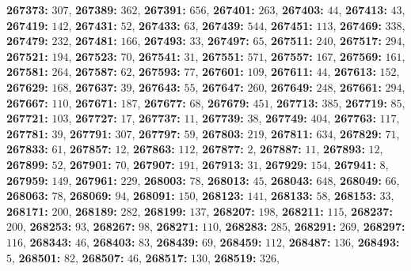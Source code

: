 \textsf{\bfseries 267373:} $307$, \textsf{\bfseries 267389:} $362$, \textsf{\bfseries 267391:} $656$, \textsf{\bfseries 267401:} $263$, \textsf{\bfseries 267403:} $44$, \textsf{\bfseries 267413:} $43$, \textsf{\bfseries 267419:} $142$, \textsf{\bfseries 267431:} $52$, \textsf{\bfseries 267433:} $63$, \textsf{\bfseries 267439:} $544$, \textsf{\bfseries 267451:} $113$, \textsf{\bfseries 267469:} $338$, \textsf{\bfseries 267479:} $232$, \textsf{\bfseries 267481:} $166$, \textsf{\bfseries 267493:} $33$, \textsf{\bfseries 267497:} $65$, \textsf{\bfseries 267511:} $240$, \textsf{\bfseries 267517:} $294$, \textsf{\bfseries 267521:} $194$, \textsf{\bfseries 267523:} $70$, \textsf{\bfseries 267541:} $31$, \textsf{\bfseries 267551:} $571$, \textsf{\bfseries 267557:} $167$, \textsf{\bfseries 267569:} $161$, \textsf{\bfseries 267581:} $264$, \textsf{\bfseries 267587:} $62$, \textsf{\bfseries 267593:} $77$, \textsf{\bfseries 267601:} $109$, \textsf{\bfseries 267611:} $44$, \textsf{\bfseries 267613:} $152$, \textsf{\bfseries 267629:} $168$, \textsf{\bfseries 267637:} $39$, \textsf{\bfseries 267643:} $55$, \textsf{\bfseries 267647:} $260$, \textsf{\bfseries 267649:} $248$, \textsf{\bfseries 267661:} $294$, \textsf{\bfseries 267667:} $110$, \textsf{\bfseries 267671:} $187$, \textsf{\bfseries 267677:} $68$, \textsf{\bfseries 267679:} $451$, \textsf{\bfseries 267713:} $385$, \textsf{\bfseries 267719:} $85$, \textsf{\bfseries 267721:} $103$, \textsf{\bfseries 267727:} $17$, \textsf{\bfseries 267737:} $11$, \textsf{\bfseries 267739:} $38$, \textsf{\bfseries 267749:} $404$, \textsf{\bfseries 267763:} $117$, \textsf{\bfseries 267781:} $39$, \textsf{\bfseries 267791:} $307$, \textsf{\bfseries 267797:} $59$, \textsf{\bfseries 267803:} $219$, \textsf{\bfseries 267811:} $634$, \textsf{\bfseries 267829:} $71$, \textsf{\bfseries 267833:} $61$, \textsf{\bfseries 267857:} $12$, \textsf{\bfseries 267863:} $112$, \textsf{\bfseries 267877:} $2$, \textsf{\bfseries 267887:} $11$, \textsf{\bfseries 267893:} $12$, \textsf{\bfseries 267899:} $52$, \textsf{\bfseries 267901:} $70$, \textsf{\bfseries 267907:} $191$, \textsf{\bfseries 267913:} $31$, \textsf{\bfseries 267929:} $154$, \textsf{\bfseries 267941:} $8$, \textsf{\bfseries 267959:} $149$, \textsf{\bfseries 267961:} $229$, \textsf{\bfseries 268003:} $78$, \textsf{\bfseries 268013:} $45$, \textsf{\bfseries 268043:} $648$, \textsf{\bfseries 268049:} $66$, \textsf{\bfseries 268063:} $78$, \textsf{\bfseries 268069:} $94$, \textsf{\bfseries 268091:} $150$, \textsf{\bfseries 268123:} $141$, \textsf{\bfseries 268133:} $58$, \textsf{\bfseries 268153:} $33$, \textsf{\bfseries 268171:} $200$, \textsf{\bfseries 268189:} $282$, \textsf{\bfseries 268199:} $137$, \textsf{\bfseries 268207:} $198$, \textsf{\bfseries 268211:} $115$, \textsf{\bfseries 268237:} $200$, \textsf{\bfseries 268253:} $93$, \textsf{\bfseries 268267:} $98$, \textsf{\bfseries 268271:} $110$, \textsf{\bfseries 268283:} $285$, \textsf{\bfseries 268291:} $269$, \textsf{\bfseries 268297:} $116$, \textsf{\bfseries 268343:} $46$, \textsf{\bfseries 268403:} $83$, \textsf{\bfseries 268439:} $69$, \textsf{\bfseries 268459:} $112$, \textsf{\bfseries 268487:} $136$, \textsf{\bfseries 268493:} $5$, \textsf{\bfseries 268501:} $82$, \textsf{\bfseries 268507:} $46$, \textsf{\bfseries 268517:} $130$, \textsf{\bfseries 268519:} $326$, 
